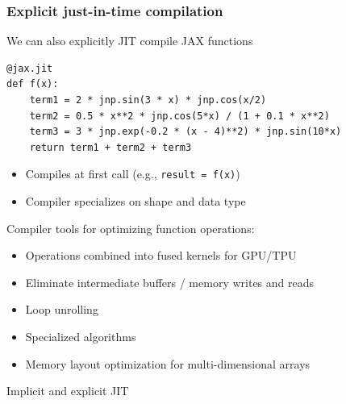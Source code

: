 \begin{frame}[fragile]
    \frametitle{Explicit just-in-time compilation}

    We can also explicitly JIT compile JAX functions
    
    \begin{verbatim}
@jax.jit
def f(x):
    term1 = 2 * jnp.sin(3 * x) * jnp.cos(x/2)
    term2 = 0.5 * x**2 * jnp.cos(5*x) / (1 + 0.1 * x**2)
    term3 = 3 * jnp.exp(-0.2 * (x - 4)**2) * jnp.sin(10*x)
    return term1 + term2 + term3 
    \end{verbatim}

    \vspace{0.5em}
    \vspace{0.5em}

    \begin{itemize}
        \item Compiles at first call (e.g., \texttt{result = f(x)})
        \item Compiler specializes on  shape and data type
    \end{itemize}

\end{frame}



\begin{frame}
    
    Compiler tools for optimizing function operations:

    \begin{itemize}
        \item Operations combined into fused kernels for GPU/TPU
        \vspace{0.5em}
        \item Eliminate intermediate buffers / memory writes and reads
        \vspace{0.5em}
        \item Loop unrolling
        \vspace{0.5em}
        \item Specialized algorithms
        \vspace{0.5em}
        \item Memory layout optimization for multi-dimensional arrays
    \end{itemize}

\end{frame}

\begin{frame}

    Implicit and explicit JIT 

    \begin{figure}[h!]
        \centering
        \scalebox{0.45}{}
    \end{figure}
    
\end{frame}




